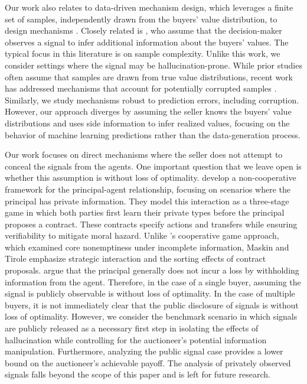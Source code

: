 Our work also relates to data-driven mechanism design, which leverages a finite set of samples, independently drawn from the buyers' value distribution, to design mechanisms \citep{cole2014sample,gonczarowski2017efficient,guo2019settling}. Closely related is \citet{devanur2016sample}, who assume that the decision-maker observes a signal to infer additional information about the buyers' values. The typical focus in this literature is on sample complexity. Unlike this work, we consider settings where the signal may be hallucination-prone. While prior studies often assume that samples are drawn from true value distributions, recent work has addressed mechanisms that account for potentially corrupted samples \citep{cai2017learning,brustle2020multi,guo2021robust,besbes2022beyond}. Similarly, we study mechanisms robust to prediction errors, including corruption. However, our approach diverges by assuming the seller knows the buyers' value distributions and uses side information to infer realized values, focusing on the behavior of machine learning predictions rather than the data-generation process.


Our work focuses on direct mechanisms where the seller does not attempt to conceal the signals from the agents. One important question that we leave open is whether this assumption is without loss of optimality. \citet{maskin&tirole1990informedprincipal} develop a non-cooperative framework for the principal-agent relationship, focusing on scenarios where the principal has private information. They model this interaction as a three-stage game in which both parties first learn their private types before the principal proposes a contract. These contracts specify actions and transfers while ensuring verifiability to mitigate moral hazard. Unlike \citet{myerson1983informedprincipal}'s cooperative game approach, which examined core nonemptiness under incomplete information, Maskin and Tirole emphasize strategic interaction and the sorting effects of contract proposals. 
\citet{maskin&tirole1990informedprincipal} argue that the principal generally does not incur a loss by withholding information from the agent. 
Therefore, in the case of a single buyer, assuming the signal is publicly observable is without loss of optimality. 
In the case of multiple buyers, it is not immediately clear that the public disclosure of signals is without loss of optimality. However, we consider the benchmark scenario in which signals are publicly released as a necessary first step in isolating the effects of hallucination while controlling for the auctioneer’s potential information manipulation. Furthermore, analyzing the public signal case provides a lower bound on the auctioneer’s achievable payoff. The analysis of privately observed signals falls beyond the scope of this paper and is left for future research.




